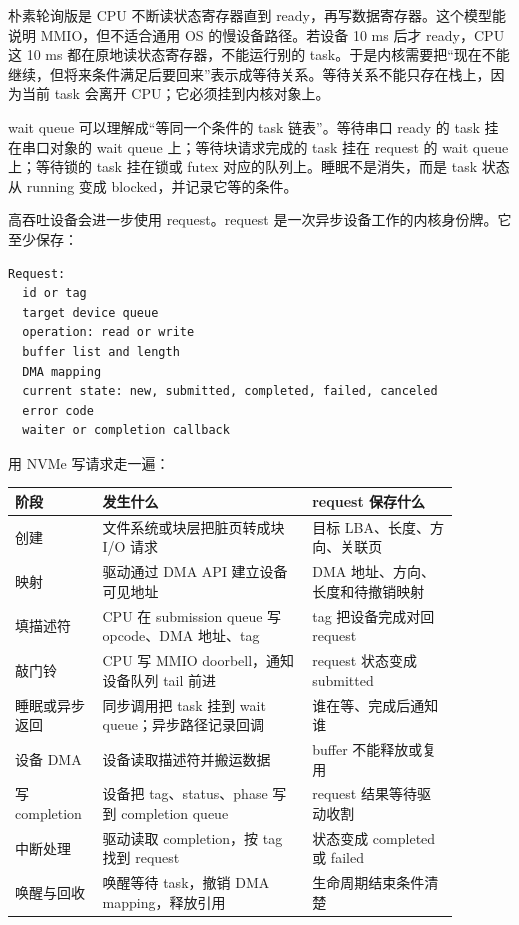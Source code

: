 朴素轮询版是 CPU 不断读状态寄存器直到 ready，再写数据寄存器。这个模型能说明 MMIO，但不适合通用 OS 的慢设备路径。若设备 10 ms 后才 ready，CPU 这 10 ms 都在原地读状态寄存器，不能运行别的 task。于是内核需要把“现在不能继续，但将来条件满足后要回来”表示成等待关系。等待关系不能只存在栈上，因为当前 task 会离开 CPU；它必须挂到内核对象上。

wait queue 可以理解成“等同一个条件的 task 链表”。等待串口 ready 的 task 挂在串口对象的 wait queue 上；等待块请求完成的 task 挂在 request 的 wait queue 上；等待锁的 task 挂在锁或 futex 对应的队列上。睡眠不是消失，而是 task 状态从 running 变成 blocked，并记录它等的条件。

高吞吐设备会进一步使用 request。request 是一次异步设备工作的内核身份牌。它至少保存：

\begin{lstlisting}
Request:
  id or tag
  target device queue
  operation: read or write
  buffer list and length
  DMA mapping
  current state: new, submitted, completed, failed, canceled
  error code
  waiter or completion callback
\end{lstlisting}

用 NVMe 写请求走一遍：

\begin{longtable}{p{0.15\linewidth}p{0.43\linewidth}p{0.3\linewidth}}
\toprule
阶段 & 发生什么 & request 保存什么 \\
\midrule
创建 & 文件系统或块层把脏页转成块 I/O 请求 & 目标 LBA、长度、方向、关联页 \\
映射 & 驱动通过 DMA API 建立设备可见地址 & DMA 地址、方向、长度和待撤销映射 \\
填描述符 & CPU 在 submission queue 写 opcode、DMA 地址、tag & tag 把设备完成对回 request \\
敲门铃 & CPU 写 MMIO doorbell，通知设备队列 tail 前进 & request 状态变成 submitted \\
睡眠或异步返回 & 同步调用把 task 挂到 wait queue；异步路径记录回调 & 谁在等、完成后通知谁 \\
设备 DMA & 设备读取描述符并搬运数据 & buffer 不能释放或复用 \\
写 completion & 设备把 tag、status、phase 写到 completion queue & request 结果等待驱动收割 \\
中断处理 & 驱动读取 completion，按 tag 找到 request & 状态变成 completed 或 failed \\
唤醒与回收 & 唤醒等待 task，撤销 DMA mapping，释放引用 & 生命周期结束条件清楚 \\
\bottomrule
\end{longtable}

